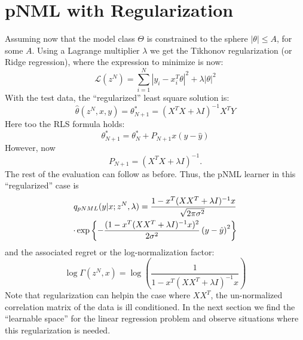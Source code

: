 \documentclass[conference,letterpaper]{IEEEtran}
\begin{document}
\section{pNML with Regularization} \label{sec:pNMLwithReg}
Assuming now that the model class $\Theta$ is constrained to the sphere  $|\theta|\leq A$, for some $A$. Using a Lagrange multiplier $\lambda$ we get the Tikhonov regularization (or Ridge regression), where the expression to minimize is now: 
\begin{equation}
\mathcal{L}(z^N)= \sum_{i=1}^{N}|y_i-x_i^T \theta|^2 + \lambda |\theta|^2
\end{equation}
With the test data, the ``regularized'' least square solution is:
\begin{equation}
\hat{\theta}(z^N,x,y) = \theta_{N+1}^* = (X^T X+ \lambda I)^{-1} X^T Y
\end{equation}
Here too the RLS formula holds: 
\begin{equation}
\theta_{N+1}^*=\theta^*_{N} + P_{N+1} x (y - \hat{y})
\end{equation}
However, now 
\begin{equation}
P_{N+1}= (X^T X+ \lambda I)^{-1}.    
\end{equation}
The rest of the evaluation can follow as before. Thus,
the pNML learner in this ``regularized'' case is 
\begin{multline} \label{eq:pNML_least_sqaures}
q_{\mbox{\tiny{pNML}}}(y|x; z^N, \lambda)
=\frac{1 - x^T (XX^T + \lambda I)^{-1} x }{\sqrt[]{2\pi\sigma^2}} \\
\cdot \exp\left\{-\frac{(1 - x^T (XX^T + \lambda I)^{-1} x )^2 }{2\sigma^2}\left(y- \hat{y} \right)^2\right\} \\
\end{multline}
and the associated regret or the log-normalization factor:
\begin{equation}
\log \Gamma (z^N,x) = \log \left( \frac{1}{1 - x^T (XX^T + \lambda I)^{-1} x } \right)
\end{equation}
Note that regularization can helpin the case where $XX^T$, the un-normalized correlation matrix of the data is
ill conditioned. In the next section we find the ``learnable space'' for the linear regression problem and observe situations where this regularization is needed.
\end{document}
